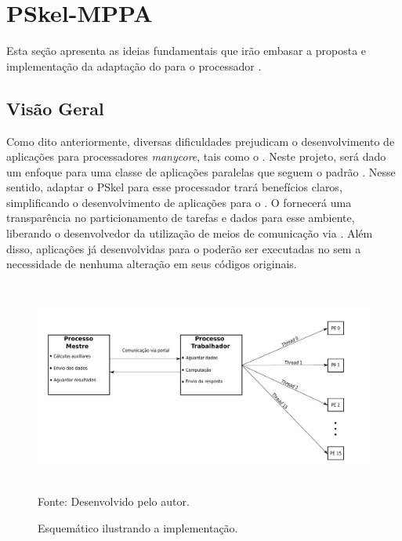 \chapter{PSkel-MPPA}
\label{cha:proposta}

Esta seção apresenta as ideias fundamentais que irão embasar a proposta e implementação
da adaptação do \fw \pskel para o processador \mppa.

\section{Visão Geral}

Como dito anteriormente, diversas dificuldades prejudicam o desenvolvimento de aplicações para
processadores \textit{manycore}, tais como o \mppa. Neste projeto, será dado um enfoque para
uma classe de aplicações paralelas que seguem o padrão \stencil. Nesse sentido, adaptar
o \fw PSkel para esse processador trará benefícios claros, simplificando o desenvolvimento
de aplicações \stencil para o \mppa. O \fw fornecerá uma transparência
no particionamento de tarefas e dados para esse ambiente, liberando o desenvolvedor
da utilização de meios de comunicação via \noc. Além disso, aplicações já desenvolvidas para o
\fw poderão ser executadas no \mppa sem a necessidade de nenhuma alteração em
seus códigos originais.



\begin{figure}[!h]
	\centering
    \caption{Esquemático ilustrando a implementação.}
    \includegraphics[width=1.2\textwidth, height=7cm]{figs/visaoGeralPSKELMPPA.pdf} \\
    Fonte: Desenvolvido pelo autor.
    \label{fig:visaoGeral}
\end{figure}



